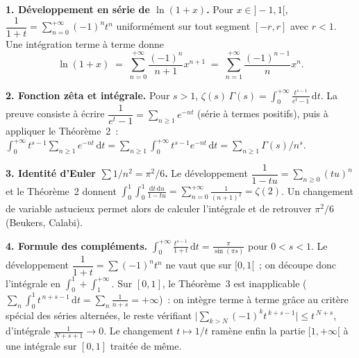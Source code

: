 \decsep{}



\begin{mdframed}[style=exbar]
  \textbf{1. Développement en série de $\ln(1+x)$.}\enspace%
  Pour $x \in {]-1,1[}$, $\dfrac{1}{1+t} = \sum_{n=0}^{+\infty} {(-1)}^n t^n$
  uniformément sur tout segment $[-r,r]$ avec $r<1$. Une intégration terme à terme
  donne
  \[
    \ln(1+x) \;=\; \sum_{n=0}^{+\infty}\frac{{(-1)}^n}{n+1}x^{n+1}
    \;=\; \sum_{n=1}^{+\infty}\frac{{(-1)}^{n-1}}{n}x^n.
  \]

  \smallskip\noindent
  \textbf{2. Fonction zêta et intégrale.}\enspace%
  Pour $s > 1$,
  $\displaystyle\zeta(s)\,\Gamma(s) = \int_0^{+\infty}\frac{t^{s-1}}{e^t-1}\,\mathrm{d}t$.
  La preuve consiste à écrire $\dfrac{1}{e^t - 1} = \sum_{n\geq 1} e^{-nt}$
  (série à termes positifs), puis à appliquer le Théorème~2~:
  $\int_0^{+\infty} t^{s-1}\sum_{n\geq 1} e^{-nt}\,\mathrm{d}t
  = \sum_{n\geq 1}\int_0^{+\infty} t^{s-1}e^{-nt}\,\mathrm{d}t
  = \sum_{n\geq 1}\Gamma(s)/n^s$.

  \smallskip\noindent
  \textbf{3. Identité d'Euler $\sum 1/n^2 = \pi^2/6$.}\enspace%
  Le développement
  $\dfrac{1}{1-tu} = \sum_{n\geq 0}{(tu)}^n$ et le Théorème~2 donnent
  $\displaystyle\int_0^1\!\int_0^1 \frac{\mathrm{d}t\,\mathrm{d}u}{1-tu}
   = \sum_{n=0}^{+\infty}\frac{1}{{(n+1)}^2} = \zeta(2)$.
  Un changement de variable astucieux permet alors de calculer
  l'intégrale et de retrouver $\pi^2/6$ (Beukers, Calabi).

  \smallskip\noindent
  \textbf{4. Formule des compléments.}\enspace%
  $\displaystyle\int_0^{+\infty} \frac{t^{s-1}}{1+t}\,\mathrm{d}t
  = \frac{\pi}{\sin(\pi s)}$ pour $0<s<1$. Le développement
  $\dfrac{1}{1+t} = \sum {(-1)}^n t^n$ ne vaut que sur $[0,1[$~; on découpe
  donc l'intégrale en $\int_0^1 + \int_1^{+\infty}$. Sur $[0,1]$, le
  Théorème~3 est inapplicable
  ($\sum_n \int_0^1 t^{\,n+s-1}\,\mathrm{d}t = \sum_n \frac{1}{n+s} = +\infty$)~:
  on intègre terme à terme grâce au critère spécial des séries alternées,
  le reste vérifiant
  $\bigl|\sum_{k>N} {(-1)}^k t^{\,k+s-1}\bigr| \leq t^{\,N+s}$, d'intégrale
  $\frac{1}{N+s+1} \to 0$. Le changement $t \mapsto 1/t$
  ramène enfin la partie $[1,+\infty[$ à une intégrale sur $[0,1]$ traitée de même.
\end{mdframed}

